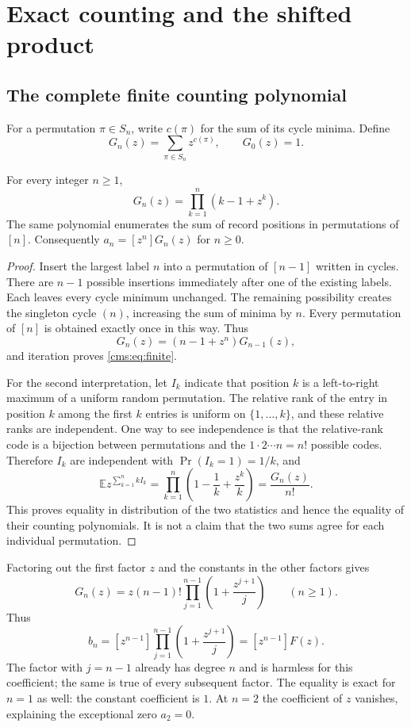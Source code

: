 \section{Exact counting and the shifted product}\label{cms:sec:counting}
\subsection{The complete finite counting polynomial}
For a permutation $\pi\in S_n$, write $c(\pi)$ for the sum of its cycle minima. Define
\[
G_n(z)=\sum_{\pi\in S_n}z^{c(\pi)},\qquad G_0(z)=1.
\]
\begin{proposition}\label{cms:prop:finite}
For every integer $n\geq1$,
\begin{equation}\label{cms:eq:finite}
G_n(z)=\prod_{k=1}^{n}(k-1+z^k).
\end{equation}
The same polynomial enumerates the sum of record positions in permutations of $[n]$. Consequently $a_n=[z^n]G_n(z)$ for $n\geq0$.
\end{proposition}
\begin{proof}
Insert the largest label $n$ into a permutation of $[n-1]$ written in cycles. There are $n-1$ possible insertions immediately after one of the existing labels. Each leaves every cycle minimum unchanged. The remaining possibility creates the singleton cycle $(n)$, increasing the sum of minima by $n$. Every permutation of $[n]$ is obtained exactly once in this way. Thus
\[
G_n(z)=(n-1+z^n)G_{n-1}(z),
\]
and iteration proves \eqref{cms:eq:finite}.

For the second interpretation, let $I_k$ indicate that position $k$ is a left-to-right maximum of a uniform random permutation. The relative rank of the entry in position $k$ among the first $k$ entries is uniform on $\{1,\ldots,k\}$, and these relative ranks are independent. One way to see independence is that the relative-rank code is a bijection between permutations and the $1\cdot2\cdots n=n!$ possible codes. Therefore $I_k$ are independent with $\Pr(I_k=1)=1/k$, and
\[
\mathbb E z^{\sum_{k=1}^{n}kI_k}
=\prod_{k=1}^{n}\left(1-\frac1k+\frac{z^k}{k}\right)
=\frac{G_n(z)}{n!}.
\]
This proves equality in distribution of the two statistics and hence the equality of their counting polynomials. It is not a claim that the two sums agree for each individual permutation.
\end{proof}

Factoring out the first factor $z$ and the constants in the other factors gives
\begin{equation}\label{cms:eq:finitefactor}
G_n(z)=z(n-1)!\prod_{j=1}^{n-1}\left(1+\frac{z^{j+1}}j\right)
\qquad(n\geq1).
\end{equation}
Thus
\begin{equation}\label{cms:eq:shift}
b_n=[z^{n-1}]\prod_{j=1}^{n-1}\left(1+\frac{z^{j+1}}j\right)
=[z^{n-1}]F(z).
\end{equation}
The factor with $j=n-1$ already has degree $n$ and is harmless for this coefficient; the same is true of every subsequent factor. The equality is exact for $n=1$ as well: the constant coefficient is $1$. At $n=2$ the coefficient of $z$ vanishes, explaining the exceptional zero $a_2=0$.


